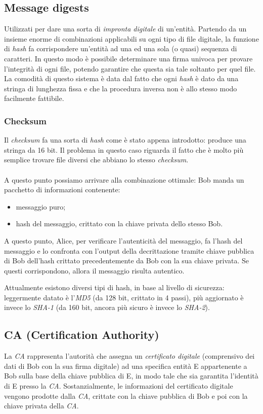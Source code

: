 \subsection{Message digests}
Utilizzati per dare una sorta di \textit{impronta digitale} di un'entità. Partendo da un insieme enorme di combinazioni applicabili su ogni tipo di file digitale, la funzione di \textit{hash} fa corrispondere un'entità ad una ed una sola (o quasi) sequenza di caratteri. In questo modo è possibile determinare una firma univoca per provare l'integrità di ogni file, potendo garantire che questa sia tale soltanto per quel file. \\
La comodità di questo sistema è data dal fatto che ogni \textit{hash} è dato da una stringa di lunghezza fissa e che la procedura inversa non è allo stesso modo facilmente fattibile.

\subsubsection{Checksum}
Il \textit{checksum} fa una sorta di \textit{hash} come è stato appena introdotto: produce una stringa da 16 bit. Il problema in questo caso riguarda il fatto che è molto più semplice trovare file diversi che abbiano lo stesso \textit{checksum}. \\ \\

A questo punto possiamo arrivare alla combinazione ottimale: Bob manda un pacchetto di informazioni contenente:
\begin{itemize}
	\item messaggio puro;
	\item hash del messaggio, crittato con la chiave privata dello stesso Bob.
\end{itemize}
A questo punto, Alice, per verificare l'autenticità del messaggio, fa l'hash del messaggio e lo confronta con l'output della decrittazione tramite chiave pubblica di Bob dell'hash crittato precedentemente da Bob con la sua chiave privata. Se questi corrispondono, allora il messaggio risulta autentico.

Attualmente esistono diversi tipi di hash, in base al livello di sicurezza: leggermente datato è l'\textit{MD5} (da 128 bit, crittato in 4 passi), più aggiornato è invece lo \textit{SHA-1} (da 160 bit, ancora più sicuro è invece lo \textit{SHA-2}).

\subsection{CA (Certification Authority)}
La \textit{CA} rappresenta l'autorità che assegna un \textit{certificato digitale} (comprensivo dei dati di Bob con la sua firma digitale) ad una specifica entità E appartenente a Bob sulla base della chiave pubblica di E, in modo tale che sia garantita l'identità di E presso la \textit{CA}. Sostanzialmente, le informazioni del certificato digitale vengono prodotte dalla \textit{CA}, crittate con la chiave pubblica di Bob e poi con la chiave privata della \textit{CA}.
\newpage

